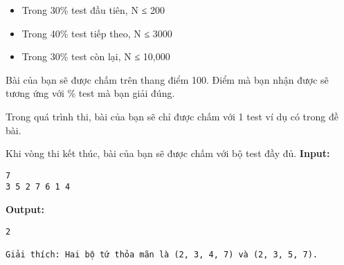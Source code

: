 \begin{itemize}
	\item Trong 30\% test đầu tiên, N ≤ 200
	\item Trong 40\% test tiếp theo, N ≤ 3000
	\item Trong 30\% test còn lại, N ≤ 10,000
\end{itemize}
Bài của bạn sẽ được chấm trên thang điểm 100. Điểm mà bạn nhận được sẽ tương ứng với \% test mà bạn giải đúng.

Trong quá trình thi, bài của bạn sẽ chỉ được chấm với 1 test ví dụ có trong đề bài.

Khi vòng thi kết thúc, bài của bạn sẽ được chấm với bộ test đầy đủ.
\textbf{Input: }
\begin{verbatim}
7
3 5 2 7 6 1 4\end{verbatim}

\textbf{Output: }
\begin{verbatim}
2

Giải thích: Hai bộ tứ thỏa mãn là (2, 3, 4, 7) và (2, 3, 5, 7).\end{verbatim}